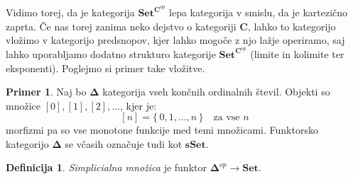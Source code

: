 \documentclass[12pt,a4paper]{book}
\theoremstyle{definition}
\newtheorem{definicija}{Definicija}[chapter]
\theoremstyle{plain}
\theoremstyle{definition}
\newtheorem{primer}{Primer}[section]
\theoremstyle{remark}
\newcommand{\cat}[1]{\textbf{#1}}
\renewcommand{\set}[1]{\{\,#1\,\}}
\newcommand{\predsnop}[1]{\cat{Set}^{\cat{#1}^{op}}}
\begin{document}
Vidimo torej, da je kategorija $\predsnop{C}$ lepa kategorija v smislu, da je kartezično zaprta. Če nas torej zanima neko dejstvo o kategoriji $\cat{C}$, lahko to kategorijo vložimo v kategorijo predsnopov, kjer lahko mogoče z njo lažje operiramo, saj lahko uporabljamo dodatno strukturo kategorije $\predsnop{C}$ (limite in kolimite ter eksponenti).
Poglejmo si primer take vložitve.

\begin{primer}
Naj bo $\mathbf{\Delta}$ kategorija vseh končnih ordinalnih števil. Objekti so množice $[0],[1],[2],\ldots$, kjer je:
$$[n] = \set{0,1,\ldots,n} \quad \text{za vse }n$$
morfizmi pa so vse monotone funkcije med temi množicami.
Funktorsko kategorijo $\mathbf{\Delta}$ se včasih označuje tudi kot $\cat{sSet}$.
\begin{definicija}
\emph{Simplicialna množica} je funktor $\mathbf{\Delta}^{op} \to \cat{Set}$.


\end{definicija}
\end{primer}
\end{document}
